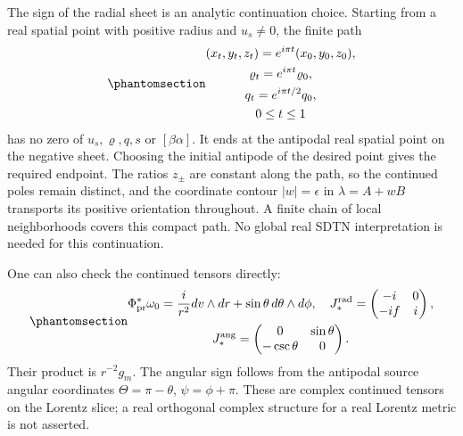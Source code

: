\documentclass[
  english,
  11pt,
  reqno]{amsart}
\begin{document}
The sign of the radial sheet is an analytic continuation choice.
Starting from a real spatial point with positive radius and \(u_s\ne0\),
the finite path
\begin{equation}\protect\phantomsection\label{eq:sh-r1-sheet-path}{\begin{gathered}
(x_t,y_t,z_t)=e^{i\pi t}(x_0,y_0,z_0), \\
\varrho_t=e^{i\pi t}\varrho_0, \\
q_t=e^{i\pi t/2}q_0, \\
0\le t\le1
\end{gathered}}\end{equation} has no zero of \(u_s,\varrho,q,s\) or \([\beta\alpha]\).
It ends at the antipodal real spatial point on the negative sheet.
Choosing the initial antipode of the desired point gives the required
endpoint. The ratios \(z_\pm\) are constant along the path, so the
continued poles remain distinct, and the coordinate contour
\(|w|=\epsilon\) in \(\lambda=A+wB\) transports its positive orientation
throughout. A finite chain of local neighborhoods covers this compact
path. No global real SDTN interpretation is needed for this
continuation.

One can also check the continued tensors directly:
\begin{equation}\protect\phantomsection\label{eq:sh-r1-continued-structure}{\begin{gathered}
\Phi_{\rm pr}^*\omega_0=\frac i{r^2}dv\wedge dr
                          +\sin\theta\,d\theta\wedge d\phi,
 \quad
 J_*^{\rm rad}=\begin{pmatrix}-i&0\\-if&i\end{pmatrix}, \\
J_*^{\rm ang}=\begin{pmatrix}0&\sin\theta\\-\csc\theta&0\end{pmatrix}.
\end{gathered}}\end{equation} Their product is \(r^{-2}g_m\). The angular sign follows
from the antipodal source angular coordinates \(\Theta=\pi-\theta\),
\(\psi=\phi+\pi\). These are complex continued tensors on the Lorentz
slice; a real orthogonal complex structure for a real Lorentz metric is
not asserted.
\end{document}
